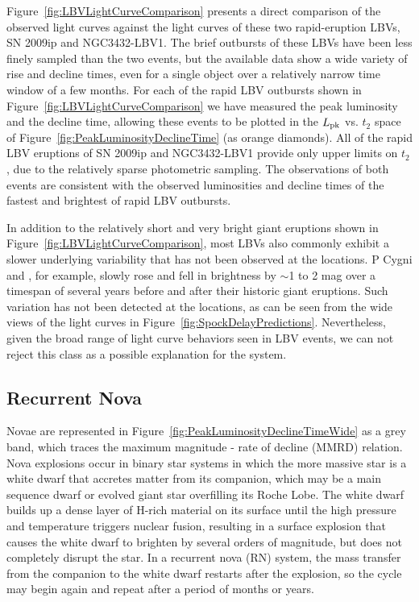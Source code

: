 Figure~\ref{fig:LBVLightCurveComparison} presents a direct comparison
of the observed \spock light curves against the light curves of these
two rapid-eruption LBVs, SN 2009ip and NGC3432-LBV1. The brief
outbursts of these LBVs have been less finely sampled than the two
\spock events, but the available data show a wide variety of rise and
decline times, even for a single object over a relatively narrow time
window of a few months. For each of the rapid LBV outbursts shown in
Figure~\ref{fig:LBVLightCurveComparison} we have measured the peak
luminosity and the decline time, allowing these events to be plotted
in the $L_{\rm pk}$ vs. $t_2$ space of
Figure~\ref{fig:PeakLuminosityDeclineTime} (as orange diamonds).  All
of the rapid LBV eruptions of SN 2009ip and NGC3432-LBV1 provide only
upper limits on $t_2$, due to the relatively sparse photometric
sampling.  The observations of both \spock events are consistent with
the observed luminosities and decline times of the fastest and
brightest of rapid LBV outbursts. 

In addition to the relatively short and very bright giant eruptions
shown in Figure~\ref{fig:LBVLightCurveComparison}, most LBVs also
commonly exhibit a slower underlying variability that has not been
observed at the \spock locations. P Cygni and \etaCar, for example,
slowly rose and fell in brightness by $\sim$1 to 2 mag over a timespan
of several years before and after their historic giant eruptions.
Such variation has not been detected at the \spock locations, as can
be seen from the wide views of the \spock light curves in
Figure~\ref{fig:SpockDelayPredictions}. Nevertheless, given the broad
range of light curve behaviors seen in LBV events, we can not reject
this class as a possible explanation for the \spock system.




\subsection{Recurrent Nova}

Novae are represented in
Figure~\ref{fig:PeakLuminosityDeclineTimeWide} as a grey band, which
traces the maximum magnitude - rate of decline (MMRD) relation.  Nova
explosions occur in binary star systems in which the more massive star
is a white dwarf that accretes matter from its companion, which may be
a main sequence dwarf or evolved giant star overfilling its Roche
Lobe. The white dwarf builds up a dense layer of H-rich material on
its surface until the high pressure and temperature triggers nuclear
fusion, resulting in a surface explosion that causes the white dwarf
to brighten by several orders of magnitude, but does not completely
disrupt the star. In a recurrent nova (RN) system, the mass transfer
from the companion to the white dwarf restarts after the explosion, so
the cycle may begin again and repeat after a period of months or
years.

